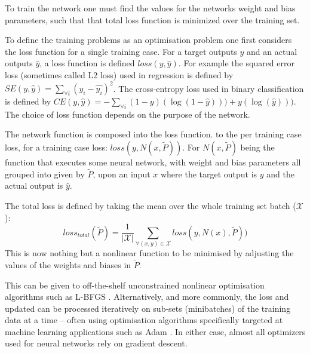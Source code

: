 \documentclass[12pt,parskip]{komatufte}\right
\begin{document}
To train the network one must find the values for the networks weight and bias parameters, such that that total loss function is minimized over the training set.

To define the training problems as an optimisation problem one first considers the loss function for a single training case.
For a target outputs $y$ and an actual outputs $\hat{y}$, a loss function is defined $loss(y, \hat{y})$.
For example the squared error loss (sometimes called L2 loss) used in regression is defined by 
$SE(y, \hat{y})=\sum_{\forall i} (y_i-\hat{y_i})^2$.
The cross-entropy loss used in binary classification is defined by
$CE(y, \hat{y})=-\sum_{\forall i} (1-y)(\log (1-\hat{y}))) + y(\log (\hat{y})))$.
The choice of loss function depends on the purpose of the network.

The network function is composed into the loss function.
to the per training case loss, for a training case loss: $loss(y, N(x,\tilde{P}))$.
For $N(x,\tilde{P})$ being the function that executes some neural network, with weight and bias parameters all grouped into given by $\tilde{P}$, upon an input $x$ where the target output is $y$ and the actual output is $\hat{y}$.

The total loss is defined by taking the mean over the whole training set batch ($\mathcal{X}$):
\begin{equation}
loss_{total}(\tilde{P}) = \frac{1}{|\mathcal{X}|}\sum_{\forall (x, y)\in\mathcal{X}} loss(y, N(x),\tilde{P}))
\end{equation}
This is now nothing but a nonlinear function to be minimised by adjusting the values of the weights and biases in $\tilde{P}$.


This can be given to off-the-shelf  unconstrained nonlinear optimisation algorithms  such as L-BFGS  \parencite{nocedal1980updating}.
Alternatively, and more commonly, the loss and updated can be processed iteratively on sub-sets (minibatches) of the training data at a time -- often using optimisation algorithms specifically targeted at machine learning applications such as Adam \parencite{kingma2014adam}.
In either case, almost all optimizers used for neural networks rely on gradient descent.

\end{document}
